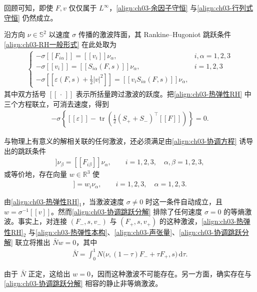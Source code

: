 ﻿\documentclass[../../main.tex]{subfiles}
\begin{document}
回顾可知，即使 $F,v$ 仅仅属于 $L^{\infty}$，\eqref{align:ch03-余因子守恒} 与\eqref{align:ch03-行列式守恒} 仍然成立。

沿方向 $\nu\in\mathbb{S}^{2}$ 以速度 $\sigma$ 传播的激波阵面，其 Rankine--Hugoniot 跳跃条件\eqref{align:ch03-RH一般形式} 在此处取为
\begin{align}
\begin{cases}
-\sigma[\![F_{i\alpha}]\!]=[\![v_{i}]\!]\nu_{\alpha}, & i,\alpha=1,2,3\\
-\sigma[\![v_{i}]\!]=[\![S_{i\alpha}(F,s)]\!]\nu_{\alpha}, & i=1,2,3\\
-\sigma[\![\varepsilon(F,s)+\frac{1}{2}|v|^{2}]\!]=[\![v_{i}S_{i\alpha}(F,s)]\!]\nu_{\alpha}, &
\end{cases}
\label{align:ch03-热弹性RH}
\end{align}
其中双方括号 $[\![\,\cdot\,]\!]$ 表示所括量跨过激波的跃度。把\eqref{align:ch03-热弹性RH} 中三个方程联立，可消去速度，得到
\begin{align}
-\sigma\left\{[\![\varepsilon]\!]-\operatorname{tr}\left(\frac{1}{2}(S_{+}+S_{-})^{\top}[\![F]\!]\right)\right\}=0.
\label{align:ch03-热弹性RH消速度}
\end{align}

与物理上有意义的解相关联的任何激波，还必须满足由\eqref{align:ch03-协调方程} 诱导出的跳跃条件
\begin{align}
[\![F_{i\alpha}]\!]\nu_{\beta}=[\![F_{i\beta}]\!]\nu_{\alpha},\qquad i=1,2,3,\quad \alpha,\beta=1,2,3,
\label{align:ch03-协调跳跃}
\end{align}
或等价地，存在向量 $w\in\mathbb{R}^{3}$ 使
\begin{align}
[\![F_{i\alpha}]\!]=w_{i}\nu_{\alpha},\qquad i=1,2,3,\quad \alpha=1,2,3.
\label{align:ch03-协调跳跃分解}
\end{align}

由\eqref{align:ch03-热弹性RH}$_{1}$，当激波速度 $\sigma\neq0$ 时这一条件自动成立，且 $w=\sigma^{-1}[\![v]\!]$。然而\eqref{align:ch03-协调跳跃分解} 排除了任何速度 $\sigma=0$ 的等熵激波。事实上，对连接 $(F_{-},s,v_{-})$ 与 $(F_{+},s,v_{+})$ 的这种激波，\eqref{align:ch03-热弹性RH}$_{2}$ 与\eqref{align:ch03-热弹性本构}、\eqref{align:ch03-声张量}、\eqref{align:ch03-协调跳跃分解} 联立将推出 $\bar{N}w=0$，其中
\begin{align}
\bar{N}=\int_{0}^{1}N\big(\nu,(1-\tau)F_{-}+\tau F_{+},s\big)\,\mathrm{d}\tau.
\label{align:ch03-积分声张量}
\end{align}

由于 $\bar{N}$ 正定，这给出 $w=0$，因而这种激波不可能存在。另一方面，确实存在与\eqref{align:ch03-协调跳跃分解} 相容的静止非等熵激波。
\end{document}
